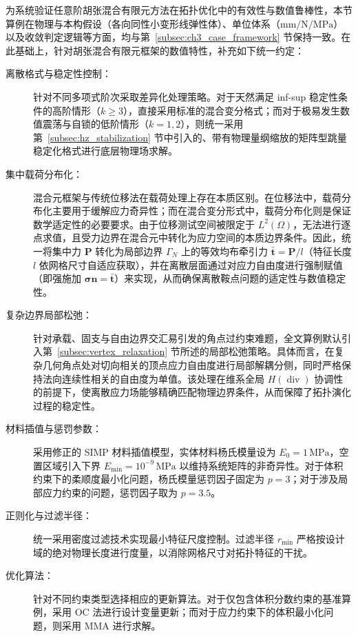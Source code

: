 为系统验证任意阶胡张混合有限元方法在拓扑优化中的有效性与数值鲁棒性，本节算例在物理与本构假设（各向同性小变形线弹性体）、单位体系（$\mathrm{mm}/\mathrm{N}/\mathrm{MPa}$）以及收敛判定逻辑等方面，均与第~\ref{subsec:ch3_case_framework} 节保持一致。在此基础上，针对胡张混合有限元框架的数值特性，补充如下统一约定：

\begin{description}
	\item[离散格式与稳定性控制：]针对不同多项式阶次采取差异化处理策略。对于天然满足 inf-sup 稳定性条件的高阶情形（$k \ge 3$），直接采用标准的混合变分格式；而对于极易发生数值震荡与自锁的低阶情形（$k=1, 2$），则统一采用第~\ref{subsec:hz_stabilization} 节中引入的、带有物理量纲缩放的矩阵型跳量稳定化格式进行底层物理场求解。
	
	\item[集中载荷分布化：]混合元框架与传统位移法在载荷处理上存在本质区别。在位移法中，载荷分布化主要用于缓解应力奇异性；而在混合变分形式中，载荷分布化则是保证数学适定性的必要要求。由于位移测试空间被限定于 $L^2(\Omega)$，无法进行逐点求值，且受力边界在混合元中转化为应力空间的本质边界条件。因此，统一将集中力 $\boldsymbol{P}$ 转化为局部边界 $\Gamma_N$ 上的等效均布牵引力 $\bar{\boldsymbol{t}} = \boldsymbol{P}/l$（特征长度 $l$ 依网格尺寸自适应获取），并在离散层面通过对应力自由度进行强制赋值（即强施加 $\boldsymbol{\sigma}\boldsymbol{n} = \bar{\boldsymbol{t}}$）来实现，从而确保离散鞍点问题的适定性与数值稳定性。
	
	\item[复杂边界局部松弛：]针对承载、固支与自由边界交汇易引发的角点过约束难题，全文算例默认引入第~\ref{subsec:vertex_relaxation} 节所述的局部松弛策略。具体而言，在复杂几何角点处对切向相关的顶点应力自由度进行局部解耦分侧，同时严格保持法向连续性相关的自由度为单值。该处理在维系全局 $H(\operatorname{div})$ 协调性的前提下，使离散应力场能够精确匹配物理边界条件，从而保障了拓扑演化过程的稳定性。
	
	\item[材料插值与惩罚参数：]采用修正的 SIMP 材料插值模型，实体材料杨氏模量设为 $E_0 = 1\,\mathrm{MPa}$，空置区域引入下界 $E_{\min} = 10^{-9}\,\mathrm{MPa}$ 以维持系统矩阵的非奇异性。对于体积约束下的柔顺度最小化问题，杨氏模量惩罚因子固定为 $p=3$；对于涉及局部应力约束的问题，惩罚因子取为 $p=3.5$。
	
	\item[正则化与过滤半径：]统一采用密度过滤技术实现最小特征尺度控制。过滤半径 $r_{\min}$ 严格按设计域的绝对物理长度进行度量，以消除网格尺寸对拓扑特征的干扰。
	
	\item[优化算法：]针对不同约束类型选择相应的更新算法。对于仅包含体积分数约束的基准算例，采用 OC 法进行设计变量更新；而对于应力约束下的体积最小化问题，则采用 MMA 进行求解。
\end{description}


